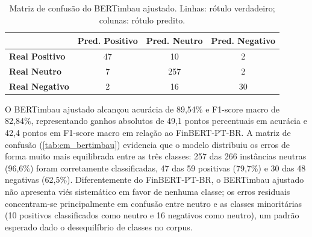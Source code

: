 \begin{table}[!htbp]
	\caption[Matriz de confusão — BERTimbau ajustado]{Matriz de confusão do BERTimbau ajustado. Linhas: rótulo verdadeiro; colunas: rótulo predito.}
	\label{tab:cm_bertimbau}
	\centering
	\begin{tabular}{lccc}
		\hline
		& \textbf{Pred. Positivo} & \textbf{Pred. Neutro} & \textbf{Pred. Negativo} \\
		\hline
		\textbf{Real Positivo} & 47                      & 10                    & 2                       \\
		\hline
		\textbf{Real Neutro}   & 7                       & 257                   & 2                       \\
		\hline
		\textbf{Real Negativo} & 2                       & 16                    & 30                      \\
		\hline
	\end{tabular}
\end{table}

O BERTimbau ajustado alcançou acurácia de 89,54\% e F1-score macro de 82,84\%, representando ganhos absolutos de 49,1 pontos percentuais em acurácia e 42,4 pontos em F1-score macro em relação ao FinBERT-PT-BR. A matriz de confusão (\autoref{tab:cm_bertimbau}) evidencia que o modelo distribuiu os erros de forma muito mais equilibrada entre as três classes: 257 das 266 instâncias neutras (96,6\%) foram corretamente classificadas, 47 das 59 positivas (79,7\%) e 30 das 48 negativas (62,5\%). Diferentemente do FinBERT-PT-BR, o BERTimbau ajustado não apresenta viés sistemático em favor de nenhuma classe; os erros residuais concentram-se principalmente em confusão entre neutro e as classes minoritárias (10 positivos classificados como neutro e 16 negativos como neutro), um padrão esperado dado o desequilíbrio de classes no corpus.